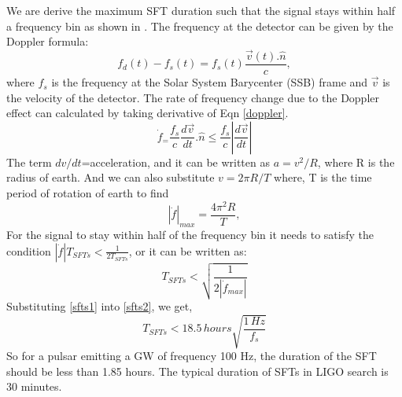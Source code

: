 \documentclass{ttuthes2007}
\begin{document}
We are derive the maximum \ac{SFT} duration such that the signal stays within half
a frequency bin as shown in \cite{Krishnan_2004}. The frequency at the detector can be given by the Doppler formula:
\begin{equation}
\label{doppler}
f_d(t) - f_s(t) = f_s(t)\frac{\vec{v}(t).\hat{n}}{c},
\end{equation}
where $f_s$ is the frequency at the Solar System Barycenter (SSB) frame and
$\vec{v}$ is the velocity of the detector.
The rate of frequency change due to the Doppler effect can calculated by taking
derivative of Eqn \ref{doppler}.
\begin{equation}
\dot{f}_= \frac{f_s}{c}\frac{d\vec{v}}{dt}.\hat{n} \leq
\frac{f_s}{c}\left|\frac{d\vec{v}}{dt}\right|
\end{equation}
The term $dv/dt$=acceleration, and it can be written as $a=v^2/R$, where R is
the radius of earth. And we can also substitute $v=2\pi R/T$ where, T is the time
period of rotation of earth to find
\begin{equation}\label{sfts1}
|\dot{f}|_{max}= \frac{4\pi^2R}{T},
\end{equation}
For the signal to stay within half of the frequency bin it needs to satisfy
the condition $|\dot{f}|T_{SFTs} < \frac{1}{2T_{SFTs}}$, or it can be written as:
\begin{equation}\label{sfts2}
T_{SFTs}<\sqrt{\frac{1}{2|\dot{f}_{max}|}}
\end{equation}
Substituting \ref{sfts1} into \ref{sfts2}, we get,
\begin{equation}
T_{SFTs} < 18.5\,hours \sqrt{\frac{1\,Hz}{f_s}}
\end{equation}
So for a pulsar emitting a \ac{GW} of frequency 100 Hz, the duration of the
\ac{SFT} should be less than 1.85 hours. The typical duration of \acp{SFT} in
\ac{LIGO} search is 30 minutes.
\end{document}
